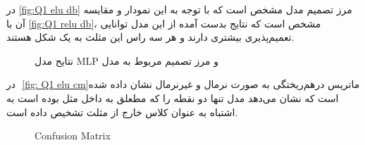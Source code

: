 \documentclass{article}
\begin{document}
در ‎\autoref{fig:Q1 elu db}‎  مرز تصمیم مدل مشخص است که با توجه به این نمودار و مقایسه آن با ‎\autoref{fig:Q1  relu db}‎، مشخص است که نتایج بدست آمده از این مدل توانایی تعمیم‌پذیری بیشتری دارند و هر سه راس این مثلث به یک شکل هستند.

\begin{figure}[H] 
	\centering
\caption{نتایح مدل MLP و مرز تصمیم مربوط به مدل}
\end{figure}


در ‎ \autoref{fig: Q1 elu cm}‎ماتریس درهم‌ریختگی به صورت نرمال و غیرنرمال نشان داده شده است که نشان می‌دهد مدل تنها دو نقطه را که مطعلق به داخل مثل بوده است به اشتباه به عنوان کلاس خارج از مثلث تشخیص داده است.
\begin{figure}[H] 
	\centering
	\caption{Confusion Matrix}
	\label{fig: Q1 elu cm}
\end{figure}
\end{document}

